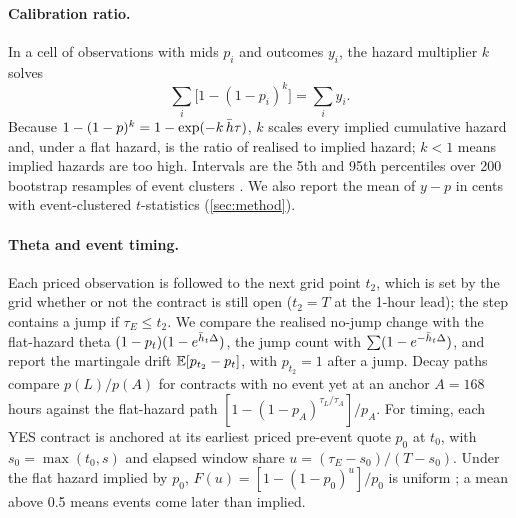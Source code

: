 \paragraph{Calibration ratio.}
In a cell of observations with mids $p_i$ and outcomes $y_i$, the hazard multiplier $k$ solves
\begin{equation}
\textstyle\sum_i\bigl[1-(1-p_i)^{k}\bigr]=\sum_i y_i .\label{haz-eq-k}
\end{equation}
Because $1-(1-p)^k=1-\exp(-k\,\bar h\tau)$, $k$ scales every implied cumulative hazard and, under a
flat hazard, is the ratio of realised to implied hazard; $k<1$ means implied hazards are too high.
Intervals are the 5th and 95th percentiles over 200 bootstrap resamples of event clusters
\citep{camerongelbachmiller2008}. We also report the mean of $y-p$ in cents with event-clustered
$t$-statistics (\cref{sec:method}).

\paragraph{Theta and event timing.}
Each priced observation is followed to the next grid point $t_2$, which is set by the grid whether or
not the contract is still open ($t_2=T$ at the 1-hour lead); the step contains a jump if
$\tau_E\le t_2$. We compare the realised no-jump change with the flat-hazard theta
$(1-p_t)(1-e^{\bar h_t\Delta})$, the jump count with $\sum(1-e^{-\bar h_t\Delta})$, and report
the martingale drift $\mathbb{E}[p_{t_2}-p_t]$, with $p_{t_2}=1$ after a jump. Decay paths compare $p(L)/p(A)$
for contracts with no event yet at an anchor $A=168$ hours against the flat-hazard path
$[1-(1-p_A)^{\tau_L/\tau_A}]/p_A$. For timing, each YES contract is anchored at its earliest priced
pre-event quote $p_0$ at $t_0$, with $s_0=\max(t_0,s)$ and elapsed window share
$u=(\tau_E-s_0)/(T-s_0)$. Under the flat hazard implied by $p_0$, $F(u)=[1-(1-p_0)^u]/p_0$ is uniform
\citep{diebold1998}; a mean above 0.5 means events come later than implied.

